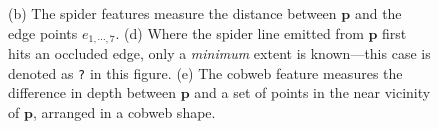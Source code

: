 \documentclass[10pt,twocolumn,letterpaper]{article}
\newcommand{\point}{\mathbf{p}}
\begin{document}
\begin{figure}
        \hfill
        \hfill
    \caption{
    (b) The spider features measure the distance between $\point$ and the edge points $e_{1, \cdots, 7}$.
    (d) Where the spider line emitted from $\point$ first hits an occluded edge, only a \textit{minimum} extent is known---this case is denoted as \texttt{?} in this figure.
    (e) The cobweb feature measures the difference in depth between $\point$ and a set of points in the near vicinity of $\point$, arranged in a cobweb shape.}%
    \label{fig:features}
\end{figure}



\end{document}
